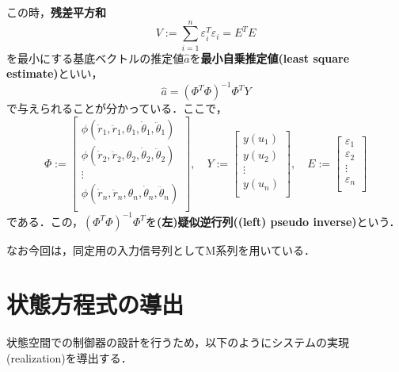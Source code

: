 この時，{\bf 残差平方和}
\[
 V := \sum^n_{i=1}\varepsilon_i^T\varepsilon_i = E^TE
\]
を最小にする基底ベクトルの推定値$\hat{a}$を{\bf 最小自乗推定値(least
square estimate)}といい，
\begin{equation}
 \hat{a} = (\Phi^T\Phi)^{-1}\Phi^TY
  \label{eq:ahat}
\end{equation}
で与えられることが分かっている．ここで，
\[
 \Phi := \left[
           \begin{array}{c}
	    \phi(\dot{r}_1, \ddot{r}_1, \theta_1, \dot{\theta}_1,
	     \ddot{\theta}_1) \\
	    \phi(\dot{r}_2, \ddot{r}_2, \theta_2, \dot{\theta}_2,
	     \ddot{\theta}_2) \\
	    \vdots \\
	    \phi(\dot{r}_n, \ddot{r}_n, \theta_n, \dot{\theta}_n,
	     \ddot{\theta}_n) \\
	   \end{array}
 \right], \quad
 Y := \left[
        \begin{array}{c}
	 y(u_1) \\
	 y(u_2) \\
	 \vdots \\
	 y(u_n) \\
	\end{array}
 \right], \quad
 E := \left[
        \begin{array}{c}
	 \varepsilon_1 \\
	 \varepsilon_2 \\
	 \vdots \\
	 \varepsilon_n \\
	\end{array}
 \right]
\]
である．この，$(\Phi^T\Phi)^{-1}\Phi^T$を{\bf (左)疑似逆行列((left)
pseudo inverse)}という．

なお今回は，同定用の入力信号列としてM系列を用いている．
\section{状態方程式の導出}
状態空間での制御器の設計を行うため，以下のようにシステムの実現
(realization)を導出する．

